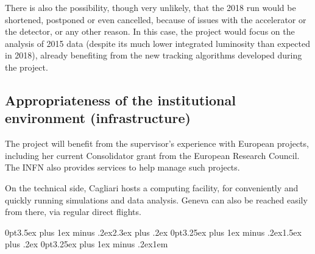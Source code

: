 \documentclass[a4paper,11pt]{article}
\begin{document}
There is also the possibility, though very unlikely, that the 2018 \pbpb run would be shortened, postponed or even cancelled, because of issues with the accelerator or the detector, or any other reason. In this case, the project would focus on the analysis of 2015 \pbpb data (despite its much lower integrated luminosity than expected in 2018), already benefiting from the new tracking algorithms developed during the project.

%      
%      
\subsection{Appropriateness of the institutional environment (infrastructure)}


The project will benefit from the supervisor's experience with European projects, including her current Consolidator grant from the European Research Council. The INFN also provides services to help manage such projects.

On the technical side, Cagliari hosts a computing facility, for conveniently and quickly running simulations and data analysis. Geneva can also be reached easily from there, via regular direct flights.

\clearpage

\titlespacing*{\section} {0pt}{3.5ex plus 1ex minus .2ex}{2.3ex plus .2ex}
\titlespacing*{\subsection} {0pt}{3.25ex plus 1ex minus .2ex}{1.5ex plus .2ex}
\titlespacing*{\paragraph} {0pt}{3.25ex plus 1ex minus .2ex}{1em}
\end{document}
